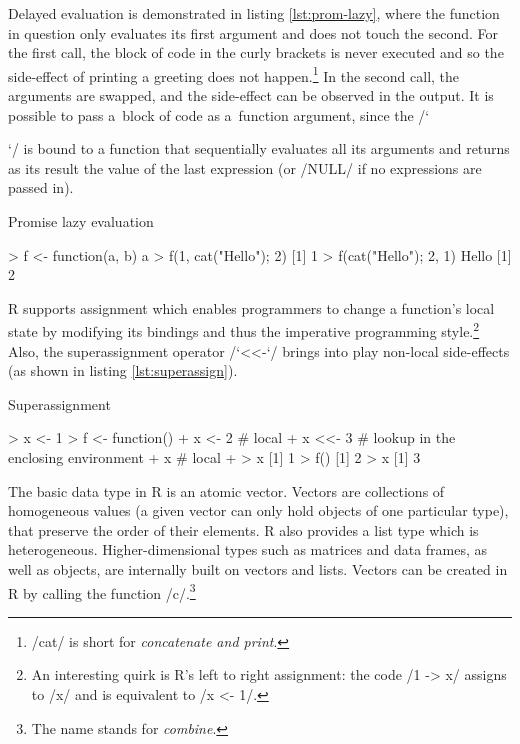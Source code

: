 Delayed evaluation is demonstrated in listing \ref{lst:prom-lazy}, where the function in question only evaluates its first argument and does not touch the second. For the first call, the block of code in the curly brackets is never executed and so the side-effect of printing a greeting does not happen.\footnote{\rinline/cat/ is short for \emph{concatenate and print}.} In the second call, the arguments are swapped, and the side-effect can be observed in the output. It is possible to pass a~block of code as a~function argument, since the \rinline/`{`/ is bound to a function that sequentially evaluates all its arguments and returns as its result the value of the last expression (or \rinline/NULL/ if no expressions are passed in).

\begin{listing}[htbp]
  \caption{\label{lst:prom-lazy}Promise lazy evaluation}
  \begin{rcode}
> f <- function(a, b) a
> f(1, {cat("Hello\n"); 2})
[1] 1
> f({cat("Hello\n"); 2}, 1)
Hello
[1] 2
  \end{rcode}
\end{listing}

R supports assignment which enables programmers to change a function's local state by modifying its bindings and thus the imperative programming style.\footnote{An interesting quirk is R's left to right assignment: the code \rinline/1 -> x/ assigns to \rinline/x/ and is equivalent to \rinline/x <- 1/.} Also, the superassignment operator \rinline/`<<-`/ brings into play non-local side-effects (as shown in listing \ref{lst:superassign}).

\begin{listing}[htbp]
  \caption{\label{lst:superassign}Superassignment}
  \begin{rcode}
> x <- 1
> f <- function() {
+     x <- 2  # local
+     x <<- 3  # lookup in the enclosing environment
+     x  # local
+ }
> x
[1] 1
> f()
[1] 2
> x
[1] 3
  \end{rcode}
\end{listing}

The basic data type in R is an atomic vector. Vectors are collections of homogeneous values (a given vector can only hold objects of one particular type), that preserve the order of their elements. R also provides a list type which is heterogeneous. Higher-dimensional types such as matrices and data frames, as well as objects, are internally built on vectors and lists. Vectors can be created in R by calling the function \rinline/c/.\footnote{The name stands for \emph{combine}.}

}
